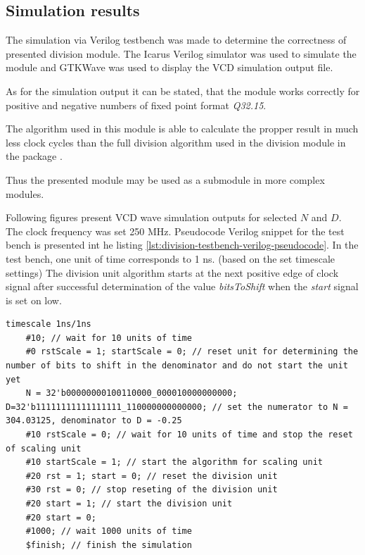 \documentclass[a4paper, twoside, 11pt]{article}
\begin{document}
\subsection{Simulation results}
The simulation via Verilog testbench was made to determine the correctness of presented division module. The Icarus Verilog simulator was used to simulate the module and GTKWave was used to display the VCD simulation output file.\par
As for the simulation output it can be stated, that the module works correctly for positive and negative numbers of fixed point format \textit{Q32.15}.\par
The algorithm used in this module is able to calculate the propper result in much less clock cycles than the full division algorithm used in the division module in the package \cite{burke-fixed-point-math-library}.\par
Thus the presented module may be used as a submodule in more complex modules.\par
Following figures present VCD wave simulation outputs for selected $N$ and $D$. The clock frequency was set 250 MHz. Pseudocode Verilog snippet for the test bench is presented int he listing \ref{lst:division-testbench-verilog-pseudocode}. In the test bench, one unit of time corresponds to 1 ns. (based on the set timescale settings) The division unit algorithm starts at the next positive edge of clock signal after successful determination of the value \textit{bitsToShift} when the \textit{start} signal is set on low.

\begin{lstlisting}[language={pseudocode}, caption={Pseudocode snippet for the Verilog simulation test bench.}, label= {lst:division-testbench-verilog-pseudocode}]
    timescale 1ns/1ns 
    #10; // wait for 10 units of time
    #0 rstScale = 1; startScale = 0; // reset unit for determining the number of bits to shift in the denominator and do not start the unit yet
    N = 32'b00000000100110000_000010000000000; D=32'b11111111111111111_110000000000000; // set the numerator to N = 304.03125, denominator to D = -0.25
    #10 rstScale = 0; // wait for 10 units of time and stop the reset of scaling unit
    #10 startScale = 1; // start the algorithm for scaling unit
    #20 rst = 1; start = 0; // reset the division unit
    #30 rst = 0; // stop reseting of the division unit
    #20 start = 1; // start the division unit
    #20 start = 0;
    #1000; // wait 1000 units of time
    $finish; // finish the simulation
\end{lstlisting}
\end{document}

